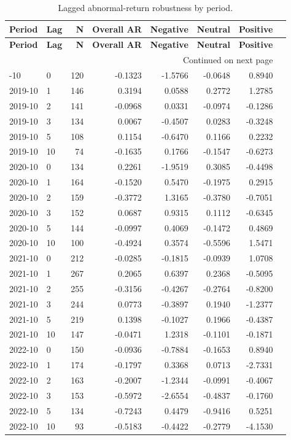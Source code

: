 \documentclass[12pt,a4paper]{article}
\begin{document}
\begin{longtable}{llrrrrrr}
\caption{Lagged abnormal-return robustness by period.}\label{tab:lag-robustness-multi-year}\\
\toprule
\textbf{Period} & \textbf{Lag} & \textbf{N} & \textbf{Overall AR} & \textbf{Negative} & \textbf{Neutral} & \textbf{Positive} \\
\midrule
\endfirsthead
\toprule
\textbf{Period} & \textbf{Lag} & \textbf{N} & \textbf{Overall AR} & \textbf{Negative} & \textbf{Neutral} & \textbf{Positive} \\
\midrule
\endhead
\midrule
\multicolumn{7}{r}{Continued on next page}\\
\endfoot
\bottomrule
\endlastfoot
2019-10 & 0 & 120 & -0.1323 & -1.5766 & -0.0648 & 0.8940 \\
2019-10 & 1 & 146 & 0.3194 & 0.0588 & 0.2772 & 1.2785 \\
2019-10 & 2 & 141 & -0.0968 & 0.0331 & -0.0974 & -0.1286 \\
2019-10 & 3 & 134 & 0.0067 & -0.4507 & 0.0283 & -0.3248 \\
2019-10 & 5 & 108 & 0.1154 & -0.6470 & 0.1166 & 0.2232 \\
2019-10 & 10 & 74 & -0.1635 & 0.1766 & -0.1547 & -0.6273 \\
2020-10 & 0 & 134 & 0.2261 & -1.9519 & 0.3085 & -0.4498 \\
2020-10 & 1 & 164 & -0.1520 & 0.5470 & -0.1975 & 0.2915 \\
2020-10 & 2 & 159 & -0.3772 & 1.3165 & -0.3780 & -0.7051 \\
2020-10 & 3 & 152 & 0.0687 & 0.9315 & 0.1112 & -0.6345 \\
2020-10 & 5 & 144 & -0.0997 & 0.4069 & -0.1472 & 0.4869 \\
2020-10 & 10 & 100 & -0.4924 & 0.3574 & -0.5596 & 1.5471 \\
2021-10 & 0 & 212 & -0.0285 & -0.1815 & -0.0939 & 1.0708 \\
2021-10 & 1 & 267 & 0.2065 & 0.6397 & 0.2368 & -0.5095 \\
2021-10 & 2 & 255 & -0.3156 & -0.4267 & -0.2764 & -0.8200 \\
2021-10 & 3 & 244 & 0.0773 & -0.3897 & 0.1940 & -1.2377 \\
2021-10 & 5 & 219 & 0.1398 & -0.1027 & 0.1966 & -0.4387 \\
2021-10 & 10 & 147 & -0.0471 & 1.2318 & -0.1101 & -0.1871 \\
2022-10 & 0 & 150 & -0.0936 & -0.7884 & -0.1653 & 0.8940 \\
2022-10 & 1 & 174 & -0.1797 & 0.3368 & 0.0713 & -2.7331 \\
2022-10 & 2 & 163 & -0.2007 & -1.2344 & -0.0991 & -0.4067 \\
2022-10 & 3 & 153 & -0.5972 & -2.6554 & -0.4837 & -0.1760 \\
2022-10 & 5 & 134 & -0.7243 & 0.4479 & -0.9416 & 0.5251 \\
2022-10 & 10 & 93 & -0.5183 & -0.4422 & -0.2779 & -4.1530 \\
\end{longtable}
\end{document}
